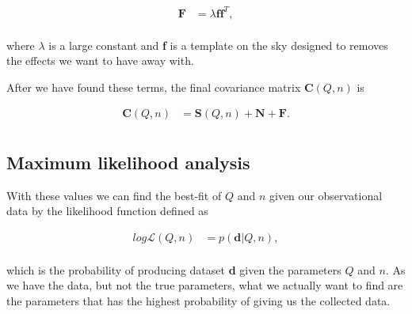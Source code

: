 \documentclass{emulateapj}
\begin{document}

\begin{equation}
\label{F_cov}
\begin{array}{rl}
\textbf{F} &= \lambda \textbf{ff}^T,   \\ 
\end{array}
\end{equation}
 
\noindent
where $\lambda$ is a large constant and \textbf{f} is a template on the sky designed to removes the effects we want to have away with.
 
  
After we have found these terms, the final covariance matrix $\textbf{C}(Q, n)$ is
 
\begin{equation}
\label{C_cov}
   \begin{array}{rl}
    \textbf{C}(Q, n) &= \textbf{S}(Q, n) + \textbf{N} + \textbf{F}.  \\ 
 \end{array}
\end{equation}



\subsection{Maximum likelihood analysis} 
 
With these values we can find the best-fit of $Q$ and $n$ given our observational data by the likelihood function defined as 

\begin{equation}
\label{likelihood}
\begin{array}{rl}
log\mathcal{L}(Q,n) &= p(\textbf{d}|Q,n),  \\ 
\end{array}
\end{equation}

\noindent
which is the probability of producing dataset \textbf{d} given the parameters $Q$ and $n$. 
As we have the data, but not the true parameters, what we actually want to find are the parameters that has the highest probability of giving us the collected data.  
\end{document}
